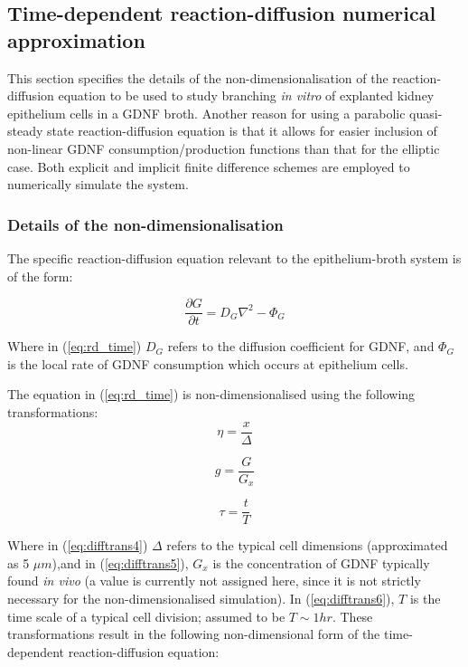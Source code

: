 \documentclass[pdftex,10pt,a4paper]{article}
\begin{document}
\subsection{Time-dependent reaction-diffusion numerical approximation}\label{subsec:timedependent}
This section specifies the details of the non-dimensionalisation of the reaction-diffusion equation to be used to study branching \emph{in vitro} of explanted kidney epithelium cells in a GDNF broth. Another reason for using a parabolic quasi-steady state reaction-diffusion equation is that it allows for easier inclusion of non-linear GDNF consumption/production functions than that for the elliptic case. Both explicit and implicit finite difference schemes are employed to numerically simulate the system.

\subsubsection{Details of the non-dimensionalisation}
The specific reaction-diffusion equation relevant to the epithelium-broth system is of the form:

\begin{equation}\label{eq:rd_time}
\frac{\partial G}{\partial t} = D_G \nabla^2 - \Phi_G
\end{equation}

Where in (\ref{eq:rd_time}) $D_G$ refers to the diffusion coefficient for GDNF, and $\Phi_G$ is the local rate of GDNF consumption which occurs at epithelium cells.


The equation in (\ref{eq:rd_time}) is non-dimensionalised using the following transformations:
\begin{equation}\label{eq:difftrans4}
\eta = \frac{x}{\Delta}
\end{equation}

\begin{equation}\label{eq:difftrans5}
g = \frac{G}{G_x}
\end{equation}

\begin{equation}\label{eq:difftrans6}
\tau = \frac{t}{T}
\end{equation}

Where in (\ref{eq:difftrans4}) $\Delta$ refers to the typical cell dimensions (approximated as 5 $\mu m$),and in (\ref{eq:difftrans5}), $G_x$ is the concentration of GDNF typically found \textit{in vivo} (a value is currently not assigned here, since it is not strictly necessary for the non-dimensionalised simulation). In (\ref{eq:difftrans6}), $T$ is the time scale of a typical cell division; assumed to be $T \sim 1 hr$. These transformations result in the following non-dimensional form of the time-dependent reaction-diffusion equation:
\end{document}
